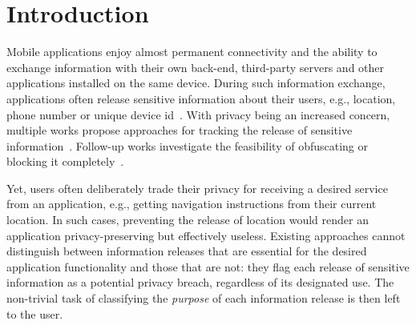 \section{Introduction}
\label{sec:intro} 
Mobile applications enjoy almost permanent connectivity and the ability to exchange information with their own back-end, third-party servers and other applications installed on the same device. 
During such information exchange, applications often release sensitive information about their users, e.g., location, phone number or unique device id~\cite{Enck:Gilbert:Chun:Cox:Jung:McDaniel:Sheth:OSDI10, Egele:Kruegel:Kirda:Vign:NDSS11,Tripp:Rubin:SEC14}. 
With privacy being an increased concern, multiple works propose approaches for tracking the release of 
sensitive information~\cite{Enck:Gilbert:Chun:Cox:Jung:McDaniel:Sheth:OSDI10,Egele:Kruegel:Kirda:Vign:NDSS11,Arzt:Rasthofer:Fritz:Bodden:Bartel:Klein:Traon:Octeau:McDaniel:PLDI14, Tripp:Rubin:SEC14,Gordon:Kim:Perkins:Gilham:Nguyen:Rinard:NDSS15}. Follow-up works investigate the
feasibility of obfuscating or blocking it completely~\cite{Hornyack:Han:Jung:Schechter:Wetherall:CCS11}.

Yet, users often deliberately trade their privacy for receiving a desired service from an application, 
e.g., getting navigation instructions from their current location. 
In such cases, preventing the release of location would render an application privacy-preserving but effectively useless.
Existing approaches cannot distinguish between information releases that are essential for the desired application functionality and those that are not: 
they flag each release of sensitive information as a potential privacy breach, regardless of its designated use.
The non-trivial task of classifying the \emph{purpose} of each information release is then left to the user. 


